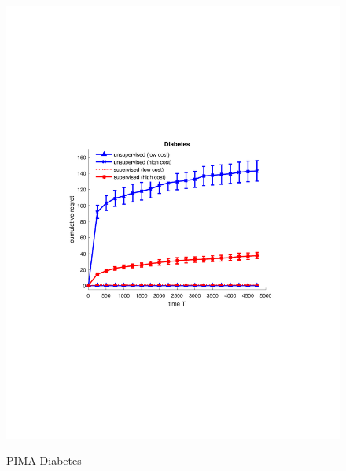 \begin{figure}[!bt]
\begin{minipage}{4cm}
		\includegraphics[scale=0.3]{../Simulations/Figures/Diabetes_WD1}
		\label{fig:Diabetes}
		\vspace{-.8cm}
		\caption{\small PIMA Diabetes}
	\end{minipage}
	\begin{minipage}{4cm}
		\centering
		\vspace{.2cm}

\end{minipage}
\end{figure}
